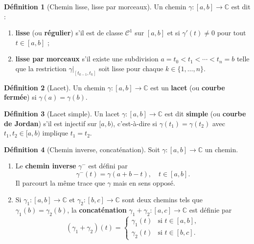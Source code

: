 \documentclass[12pt,a4paper,openany]{book}
\theoremstyle{definition}
\newtheorem{definition}{Définition}[chapter]
\theoremstyle{plain}
\theoremstyle{remark}
\newcommand{\C}{\mathbb{C}}
\begin{document}
\begin{definition}[Chemin lisse, lisse par morceaux]\label{def:chemin-lisse}
Un chemin $\gamma \colon [a,b] \to \C$ est dit :
\begin{enumerate}[label=\textup{(\roman*)}]
  \item \textbf{lisse} (ou \textbf{régulier}) s'il est de
    classe $\mathcal{C}^1$ sur $[a,b]$ et si $\gamma'(t) \neq 0$ pour tout
    $t \in [a,b]$ ;
  \item \textbf{lisse par morceaux} s'il
    existe une subdivision $a = t_0 < t_1 < \cdots < t_n = b$ telle que la
    restriction $\gamma|_{[t_{k-1},t_k]}$ soit lisse pour chaque
    $k \in \{1,\ldots,n\}$.
\end{enumerate}
\end{definition}

\begin{definition}[Lacet]\label{def:lacet}
Un chemin $\gamma \colon [a,b] \to \C$ est un \textbf{lacet}
(ou \textbf{courbe fermée}) si $\gamma(a) = \gamma(b)$.
\end{definition}

\begin{definition}[Lacet simple]\label{def:lacet-simple}
Un lacet $\gamma \colon [a,b] \to \C$ est dit \textbf{simple}
(ou \textbf{courbe de Jordan}) s'il est injectif sur $[a,b)$, c'est-à-dire si
$\gamma(t_1) = \gamma(t_2)$ avec $t_1, t_2 \in [a,b)$ implique $t_1 = t_2$.
\end{definition}

\begin{definition}[Chemin inverse, concaténation]\label{def:chemin-operations}
Soit $\gamma \colon [a,b] \to \C$ un chemin.
\begin{enumerate}[label=\textup{(\roman*)}]
  \item Le \textbf{chemin inverse} $\gamma^-$ est défini par
    \[
      \gamma^-(t) = \gamma(a + b - t), \quad t \in [a,b].
    \]
    Il parcourt la même trace que $\gamma$ mais en sens opposé.
  \item Si $\gamma_1 \colon [a,b] \to \C$ et $\gamma_2 \colon [b,c] \to \C$
    sont deux chemins tels que $\gamma_1(b) = \gamma_2(b)$, la
    \textbf{concaténation} $\gamma_1 + \gamma_2 \colon
    [a,c] \to \C$ est définie par
    \[
      (\gamma_1 + \gamma_2)(t) =
      \begin{cases}
        \gamma_1(t) & \text{si } t \in [a,b], \\
        \gamma_2(t) & \text{si } t \in [b,c].
      \end{cases}
    \]
\end{enumerate}
\end{definition}
\end{document}
